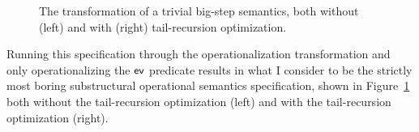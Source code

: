 \smallskip
{}
\smallskip

\begin{figure}
\begin{minipage}[b]{0.55\linewidth}
\end{minipage}
\hspace{0.5cm}
\begin{minipage}[b]{0.45\linewidth}
\end{minipage}
\caption{The transformation of a trivial big-step semantics, both
  without (left) and with (right) tail-recursion optimization.}
\label{fig:sos-tailrecursion}
\end{figure}

Running this specification through the operationalization
transformation and only operationalizing the ${\sf ev}$ predicate
results in what I consider to be the strictly most boring
substructural operational semantics specification, shown in
Figure~\ref{fig:sos-tailrecursion} both without the tail-recursion
optimization (left) and with the tail-recursion optimization (right).

